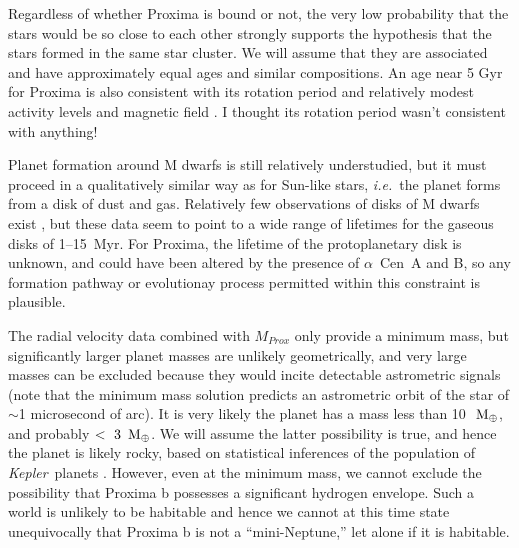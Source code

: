 \documentclass[preprint,12pt]{aastex}
\newcommand{\xxx}[1]{{\color{red} #1}} %
\def\mearth{{\rm\,M_\oplus}}
\def\eg{{\it e.g.\ }}
\def\ie{{\it i.e.\ }}
\def\acen{{$\alpha$~Cen}}
\def\kepler{{\it Kepler}}
\begin{document}
Regardless of whether Proxima is bound or not, the very low
probability that the stars would be so close to each other strongly
supports the hypothesis that the stars formed in the same star
cluster. We will assume that they are associated and have
approximately equal ages and similar compositions. An age near 5 Gyr
for Proxima is also consistent with its rotation period and relatively
modest activity levels and magnetic field \citep{ReinersBasri08}. 
\xxx{I thought its rotation period wasn't consistent with anything!}

Planet formation around M dwarfs is still relatively understudied, but
it must proceed in a qualitatively similar way as for Sun-like stars,
\ie the planet forms from a disk of dust and gas. Relatively few
observations of disks of M dwarfs exist
\citep[\eg][]{Hernandez07,WilliamsCieza11,Luhman12,Downes15}, but
these data seem to point to a wide range of lifetimes for the gaseous
disks of 1--15~Myr. For Proxima, the lifetime of the protoplanetary
disk is unknown, and could have been altered by the presence of
\acen~A and B, so any formation pathway or evolutionay process
permitted within this constraint is plausible.

The radial velocity data combined with $M_{Prox}$ only provide a
minimum mass, but significantly larger planet masses are unlikely
geometrically, and very large masses can be excluded because they
would incite detectable astrometric signals (note that the minimum
mass solution predicts an astrometric orbit of the star of $\sim$1
microsecond of arc). It is very likely the planet has a mass less than
10~$\mearth$, and probably $<~3~\mearth$. We will assume the latter
possibility is true, and hence the planet is likely rocky, based on
statistical inferences of the population of \kepler~planets
\citep{WeissMarcy14,Rogers15}. However, even at the minimum mass, we
cannot exclude the possibility that Proxima b possesses a significant
hydrogen envelope. Such a world is unlikely to be habitable \citep[but
  see][]{PierrehumbertGaidos11} and hence we cannot at this time state
unequivocally that Proxima b is not a ``mini-Neptune,'' let alone if
it is habitable.
\end{document}
